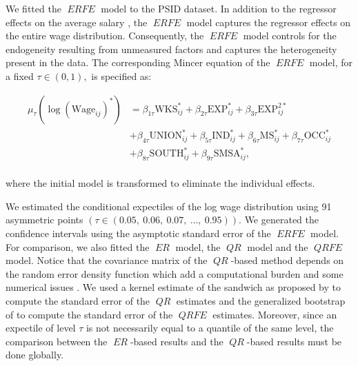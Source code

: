 \documentclass[15pt,a4paper]{article}
\DeclareMathOperator{\ERFE}{\textit{ERFE}}
\DeclareMathOperator{\QRFE}{\textit{QRFE}}
\DeclareMathOperator{\ER}{\textit{ER}}
\DeclareMathOperator{\QR}{\textit{QR}}
\begin{document}
We fitted the $\ERFE$ model to the PSID dataset. In addition to the regressor effects on the average salary \citep{baltagi2008, BaltagiKhantiAkom1990,  CornwellRupert1988}, the $\ERFE$ model captures the regressor effects on the entire wage distribution. Consequently, the $\ERFE$ model controls for the endogeneity resulting from unmeasured factors and captures the heterogeneity present in the data. The corresponding Mincer equation of the $\ERFE$ model, for a fixed $\tau\in (0,1),$ is specified as:

\begin{equation*}
    \begin{split}
   \mu_{\tau}(\log(\text{Wage}_{ij})^*)  
    & = \beta_{1\tau} \text{WKS}_{ij}^* + \beta_{2\tau} \text{EXP}_{ij}^* + \beta_{3\tau} \text{EXP}_{ij}^{2*} \\
    & + \beta_{4\tau} \text{UNION}_{ij}^* + \beta_{5\tau} \text{IND}_{ij}^* + \beta_{6\tau} \text{MS}_{ij}^* + \beta_{7\tau} \text{OCC}_{ij}^* \\
    & + \beta_{8\tau} \text{SOUTH}_{ij}^* + \beta_{9\tau} \text{SMSA}_{ij}^*,\\
   \end{split}
\end{equation*}

where the initial model is transformed to eliminate the individual effects.  

 
We estimated the conditional expectiles of the log wage distribution using 91 asymmetric points \( (\tau \in (0.05,\ 0.06,\ 0.07,\ \ldots,\ 0.95)).\) We generated the confidence intervals using the asymptotic standard error of the $\ERFE$ model. For comparison, we also fitted the $\ER$ model, the $\QR$ model and the $\QRFE$ model. Notice that the covariance matrix of the $\QR$-based method depends on the random error density function which add a computational burden and some numerical issues \citep{Chen2004, YinCai2005a, kocherginskyPracticalConfidenceIntervals2005}. We used a kernel estimate of the sandwich as proposed by \citet{barnettNonparametricSemiparametricMethods1991} to compute the standard error of the $\QR$ estimates and the generalized bootstrap of \citet{boseGeneralizedBootstrapEstimators2003}  to compute the standard error of the $\QRFE$ estimates.
Moreover, since an expectile of level \(\tau\) is not necessarily equal to a quantile of the same level, the comparison between the $\ER$-based results and the $\QR$-based results must be done globally. 
\end{document}
